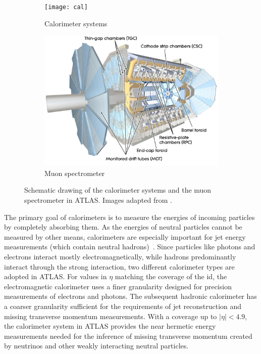 \begin{figure}
	\centering
	\begin{subfigure}[b]{0.49\linewidth}
		\centering\texttt{[image: cal]}
		\caption{Calorimeter systems\label{fig:calorimeters}}
	\end{subfigure}\hfill
	\begin{subfigure}[b]{0.49\linewidth}
		\centering\includegraphics[width=\textwidth]{ms}
		\caption{Muon spectrometer\label{fig:muon_system}}
	\end{subfigure}%
	\caption{Schematic drawing of the  calorimeter systems and  the muon spectrometer in ATLAS. Images adapted from \cite{Pequenao:1095927,Pequenao:1095929}.}\label{fig:cal_ms_schematic}
\end{figure}

The primary goal of calorimeters is to measure the energies of incoming particles by completely absorbing them.
As the energies of neutral particles cannot be measured by other means, calorimeters are especially important for jet energy measurements (which contain neutral hadrons)~\cite{Brock:1354959}.
Since particles like photons and electrons interact mostly electromagnetically, while hadrons predominantly interact through the strong interaction, two different calorimeter types are adopted in ATLAS.
For values in $\eta$ matching the coverage of the \gls{id}, the electromagnetic calorimeter uses a finer granularity designed for precision measurements of electrons and photons.
The subsequent hadronic calorimeter has a coarser granularity sufficient for the requirements of jet reconstruction and missing transverse momentum measurements.
With a coverage up to $\vert\eta\vert <4.9$, the calorimeter system in ATLAS provides the near hermetic energy measurements needed for the inference of missing transverse momentum created by neutrinos and other weakly interacting neutral particles.

